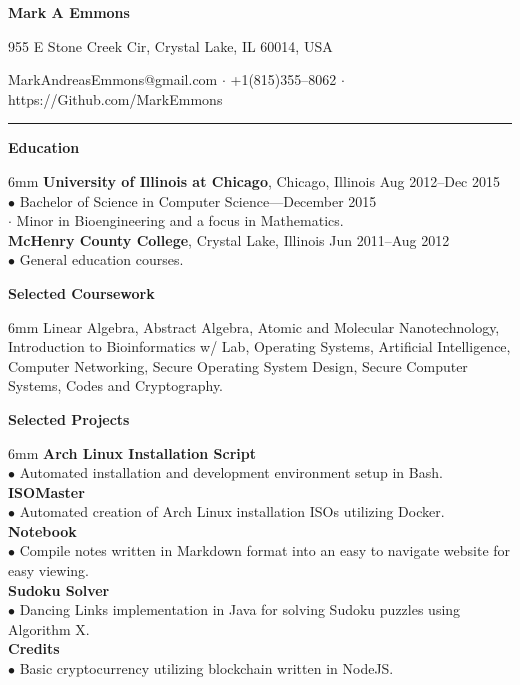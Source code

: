 \documentclass[11pt]{article}
\newcommand{\sectionheader}[1]{\noindent \textbf{\large #1}}
\newenvironment{sectionbody}{\begin{adjustwidth}{6mm}{}}{\end{adjustwidth}}
\begin{document}

\centerline{\LARGE \bf Mark A Emmons}
\centerline{955 E Stone Creek Cir, Crystal Lake, IL 60014, USA}
\centerline{MarkAndreasEmmons@gmail.com $\cdot$ +1(815)355--8062 $\cdot$ https://Github.com/MarkEmmons}

\noindent\rule{16.5cm}{0.4pt}

\sectionheader{Education}
\begin{sectionbody}
{\bf University of Illinois at Chicago}, Chicago, Illinois \hfill Aug 2012--Dec 2015 \\
$\bullet$ Bachelor of Science in Computer Science---December 2015 \\
\indent $\cdot$ Minor in Bioengineering and a focus in Mathematics. \\
{\bf McHenry County College}, Crystal Lake, Illinois \hfill Jun 2011--Aug 2012 \\
$\bullet$ General education courses.
\end{sectionbody}

\vspace{2mm}

\sectionheader{Selected Coursework}
\begin{sectionbody}
Linear Algebra, Abstract Algebra, Atomic and Molecular Nanotechnology, Introduction to Bioinformatics w/ Lab, Operating Systems, Artificial Intelligence, Computer Networking, Secure Operating System Design, Secure Computer Systems, Codes and Cryptography.
\end{sectionbody}

\vspace{2mm}

\sectionheader{Selected Projects}
\begin{sectionbody}
{\bf Arch Linux Installation Script} \\
$\bullet$ Automated installation and development environment setup in Bash. \\
{\bf ISOMaster} \\
$\bullet$ Automated creation of Arch Linux installation ISOs utilizing Docker. \\
{\bf Notebook} \\
$\bullet$ Compile notes written in Markdown format into an easy to navigate website for easy viewing. \\
{\bf Sudoku Solver} \\
$\bullet$ Dancing Links implementation in Java for solving Sudoku puzzles using Algorithm X. \\
{\bf Credits} \\
$\bullet$ Basic cryptocurrency utilizing blockchain written in NodeJS.
\end{sectionbody}
\end{document}
